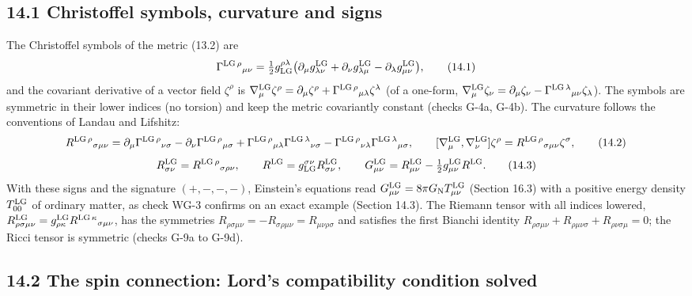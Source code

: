 \documentclass[
  10pt,
]{article}
\begin{document}
\hypertarget{christoffel-symbols-curvature-and-signs}{%
\subsection{14.1 Christoffel symbols, curvature and
signs}\label{christoffel-symbols-curvature-and-signs}}

The Christoffel symbols of the metric (13.2) are
\[\Gamma^{{\rm LG}\,\rho}{}_{\mu\nu}=\tfrac12g_{\rm LG}^{\rho\lambda}\big(\partial_\mu g^{\rm LG}_{\lambda\nu}+\partial_\nu g^{\rm LG}_{\lambda\mu}-\partial_\lambda g^{\rm LG}_{\mu\nu}\big),\tag{14.1}\]
and the covariant derivative of a vector field \(\zeta^\rho\) is
\(\nabla^{\rm LG}_\mu\zeta^\rho=\partial_\mu\zeta^\rho+\Gamma^{{\rm LG}\,\rho}{}_{\mu\lambda}\zeta^\lambda\)
(of a one-form,
\(\nabla^{\rm LG}_\mu\zeta_\nu=\partial_\mu\zeta_\nu-\Gamma^{{\rm LG}\,\lambda}{}_{\mu\nu}\zeta_\lambda\)).
The symbols are symmetric in their lower indices (no torsion) and keep
the metric covariantly constant (checks G-4a, G-4b). The curvature
follows the conventions of Landau and Lifshitz:
\[R^{{\rm LG}\,\rho}{}_{\sigma\mu\nu}=\partial_\mu\Gamma^{{\rm LG}\,\rho}{}_{\nu\sigma}-\partial_\nu\Gamma^{{\rm LG}\,\rho}{}_{\mu\sigma}+\Gamma^{{\rm LG}\,\rho}{}_{\mu\lambda}\Gamma^{{\rm LG}\,\lambda}{}_{\nu\sigma}-\Gamma^{{\rm LG}\,\rho}{}_{\nu\lambda}\Gamma^{{\rm LG}\,\lambda}{}_{\mu\sigma},\qquad[\nabla^{\rm LG}_\mu,\nabla^{\rm LG}_\nu]\zeta^\rho=R^{{\rm LG}\,\rho}{}_{\sigma\mu\nu}\zeta^\sigma,\tag{14.2}\]
\[R^{\rm LG}_{\sigma\nu}=R^{{\rm LG}\,\rho}{}_{\sigma\rho\nu},\qquad R^{\rm LG}=g_{\rm LG}^{\sigma\nu}R^{\rm LG}_{\sigma\nu},\qquad G^{\rm LG}_{\mu\nu}=R^{\rm LG}_{\mu\nu}-\tfrac12g^{\rm LG}_{\mu\nu}R^{\rm LG}.\tag{14.3}\]
With these signs and the signature \((+,-,-,-)\), Einstein's equations
read \(G^{\rm LG}_{\mu\nu}=8\pi G_{\rm N}T^{\rm LG}_{\mu\nu}\) (Section
16.3) with a positive energy density \(T^{\rm LG}_{00}\) of ordinary
matter, as check WG-3 confirms on an exact example (Section 14.3). The
Riemann tensor with all indices lowered,
\(R^{\rm LG}_{\rho\sigma\mu\nu}=g^{\rm LG}_{\rho\kappa}R^{{\rm LG}\,\kappa}{}_{\sigma\mu\nu}\),
has the symmetries
\(R_{\rho\sigma\mu\nu}=-R_{\sigma\rho\mu\nu}=R_{\mu\nu\rho\sigma}\) and
satisfies the first Bianchi identity
\(R_{\rho\sigma\mu\nu}+R_{\rho\mu\nu\sigma}+R_{\rho\nu\sigma\mu}=0\);
the Ricci tensor is symmetric (checks G-9a to G-9d).

\hypertarget{the-spin-connection-lords-compatibility-condition-solved}{%
\subsection{14.2 The spin connection: Lord's compatibility condition
solved}\label{the-spin-connection-lords-compatibility-condition-solved}}
\end{document}
